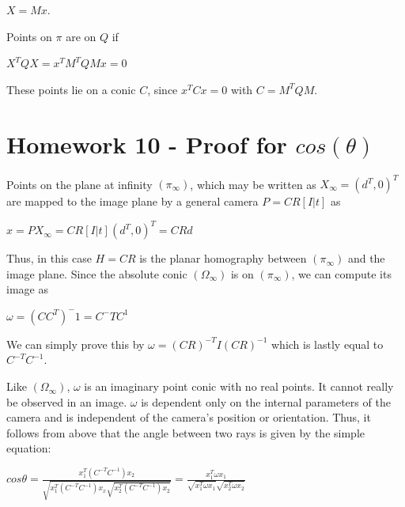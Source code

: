 \documentclass[]{article}
\begin{document}
\centerline {
	$X= Mx$. 
}

Points on $\pi$ are on $Q$ if 

\vspace{0.5em}

\centerline {
	$X^TQX = x^TM^TQMx = 0$
}

\vspace{0.5em}

These points lie on a conic $C$, since $x^TCx = 0$ with $C = M^TQM$.
\section{Homework 10 - Proof for $cos(\theta)$}  

Points on the plane at infinity $(\pi _ \infty)$, which may be written as $X_ \infty = (d^T, 0)^T$ are mapped to the image plane by a general camera $P = CR[I|t]$ as 

\vspace{0.5em}

\centerline {
	$x = PX_ \infty = CR[I|t](d^T, 0)^T = CRd$
}

\vspace{0.5em}

Thus, in this case $H = CR$ is the planar homography between $(\pi _ \infty)$ and the image plane. Since the absolute conic $(\Omega _ \infty)$ is on $(\pi _ \infty)$, we can compute its image as 

\vspace{0.5em}

\centerline {
	$\omega = (CC^T)^-1 = C^-TC^1$
}

\vspace{0.5em}

We can simply prove this by $\omega = (CR)^{-T} I (CR)^{-1}$ which is lastly equal to $C^{-T}C^{-1}$. 

\vspace{0.5em}

Like  $(\Omega _ \infty)$, $\omega$ is an imaginary point conic with no real points. It cannot really be observed in an image. $\omega$ is dependent only on the internal parameters of the camera and is independent of the camera's position or orientation. Thus,
it follows from above that the angle between two rays is given by the simple equation:

\vspace{0.5em}

\centerline {
	$cos \theta = \frac{x_1^T(C^{-T}C^{-1})x_2}{\sqrt{x_1^T(C^{-T}C^{-1})x_x \sqrt{x_2^T(C^{-T}C^{-1})x_2}}} = \frac{x_1^T \omega x_1}{\sqrt{x_1^T \omega x_1} \sqrt{x_2^T \omega x_2}}$
}
\end{document}
